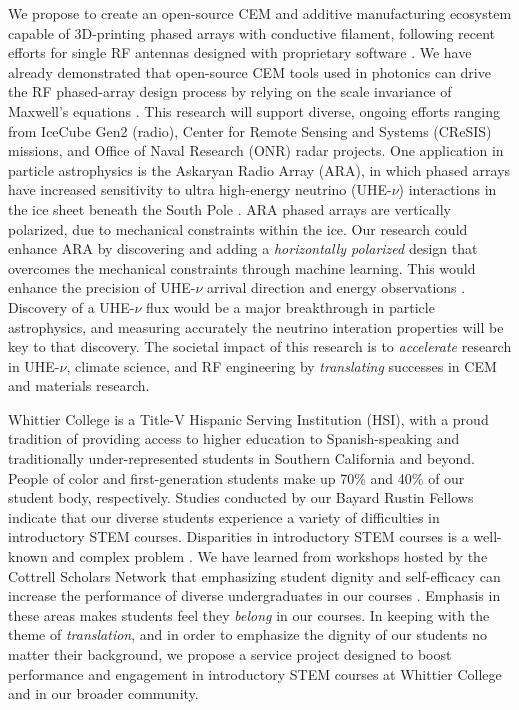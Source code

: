 \documentclass[../../main.tex]{subfiles}
\begin{document}
We propose to create an open-source CEM and additive manufacturing ecosystem capable of 3D-printing phased arrays with conductive filament, following recent efforts for single RF antennas designed with proprietary software \cite{10.3390/electronics8121506, yurduseven,8786183}.  We have already demonstrated that open-source CEM tools used in photonics can drive the RF phased-array design process by relying on the scale invariance of Maxwell's equations \cite{electronics10040415,meepcon2022,10.1016/j.cpc.2009.11.008}.  This research will support diverse, ongoing efforts ranging from IceCube Gen2 (radio), Center for Remote Sensing and Systems (CReSIS) missions, and Office of Naval Research (ONR) radar projects.  One application in particle astrophysics is the Askaryan Radio Array (ARA), in which phased arrays have increased sensitivity to ultra high-energy neutrino (UHE-$\nu$) interactions in the ice sheet beneath the South Pole \cite{PhysRevD.105.122006}.  ARA phased arrays are vertically polarized, due to mechanical constraints within the ice.  Our research could enhance ARA by discovering and adding a \textit{horizontally polarized} design that overcomes the mechanical constraints through machine learning.  This would enhance the precision of UHE-$\nu$ arrival direction and energy observations \cite{10.1088/1748-0221/15/09/p09039}.  Discovery of a UHE-$\nu$ flux would be a major breakthrough in particle astrophysics, and measuring accurately the neutrino interation properties will be key to that discovery.  The societal impact of this research is to \textit{accelerate} research in UHE-$\nu$, climate science, and RF engineering by \textit{translating} successes in CEM and materials research. \\ \vspace{2.5mm}

Whittier College is a Title-V Hispanic Serving Institution (HSI), with a proud tradition of providing access to higher education to Spanish-speaking and traditionally under-represented students in Southern California and beyond.  People of color and first-generation students make up 70\% and 40\% of our student body, respectively.  Studies conducted by our Bayard Rustin Fellows indicate that our diverse students experience a variety of difficulties in introductory STEM courses.  Disparities in introductory STEM courses is a well-known and complex problem \cite{doi:10.1146/annurev-soc-071312-145659}.  We have learned from workshops hosted by the Cottrell Scholars Network that emphasizing student dignity and self-efficacy can increase the performance of diverse undergraduates in our courses \cite{cottrell1,cottrell2}.  Emphasis in these areas makes students feel they \textit{belong} in our courses. In keeping with the theme of \textit{translation}, and in order to emphasize the dignity of our students no matter their background, we propose a service project designed to boost performance and engagement in introductory STEM courses at Whittier College and in our broader community. \\ \vspace{2.5mm}
\end{document}
